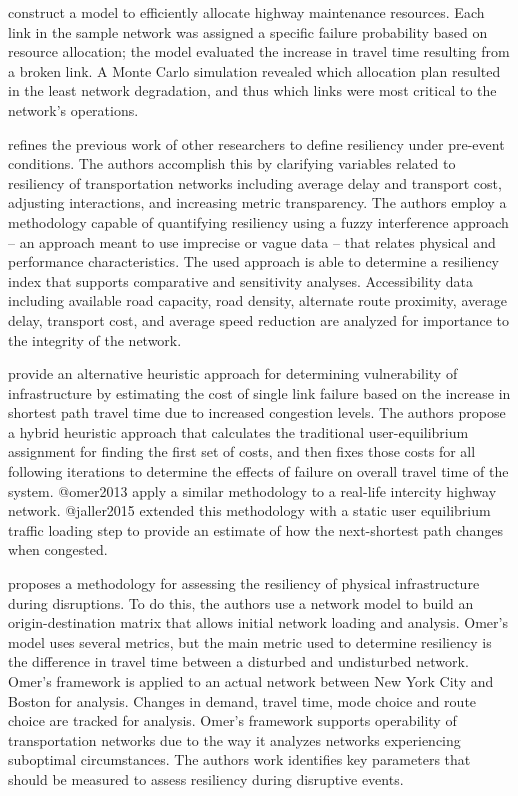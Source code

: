 \cite{peeta2010} construct a model to efficiently allocate
highway maintenance resources. Each link in the sample network was
assigned a specific failure probability based on resource allocation;
the model evaluated the increase in travel time resulting from a broken
link. A Monte Carlo simulation revealed which allocation plan resulted in
the least
network degradation, and thus which links were most critical to the
network's
operations.

\cite{serulle2011} refines the previous work of other researchers to
define resiliency under
pre-event conditions. The authors accomplish this by clarifying variables
related to resiliency
of transportation networks including average delay and transport cost,
adjusting interactions,
and increasing metric transparency. The authors employ a methodology
capable of quantifying
resiliency using a fuzzy interference approach – an approach meant to use
imprecise or vague data
– that relates physical and performance characteristics. The used approach
is able to determine a
resiliency index that supports comparative and sensitivity analyses.
Accessibility data including
available road capacity, road density, alternate route proximity, average
delay, transport cost,
and average speed reduction are analyzed for importance to the integrity
of the network.

\cite{ibrahim2011} provide an alternative heuristic approach for
determining
vulnerability of infrastructure by estimating the cost of single link
failure
based on the increase in shortest path travel time due to increased
congestion
levels. The authors propose a hybrid heuristic approach that calculates the
traditional user-equilibrium assignment for finding the first set of
costs, and
then fixes those costs for all following iterations to determine the
effects of
failure on overall travel time of the system.  @omer2013 apply a similar
methodology
to a real-life intercity highway network. @jaller2015 extended this
methodology
with a static user equilibrium traffic loading step to provide an estimate
of
how the next-shortest path changes when congested.

\cite{omer2013} proposes a methodology for assessing the resiliency of
physical infrastructure
during disruptions. To do this, the authors use a network model to build
an origin-destination
matrix that allows initial network loading and analysis. Omer’s model uses
several metrics, but
the main metric used to determine resiliency is the difference in travel
time between a disturbed
and undisturbed network. Omer’s framework is applied to an actual network
between New York City
and Boston for analysis. Changes in demand, travel time, mode choice and
route choice are tracked
for analysis. Omer’s framework supports operability of transportation
networks due to the way it
analyzes networks experiencing suboptimal circumstances. The authors work
identifies key
parameters that should be measured to assess resiliency during disruptive
events.

